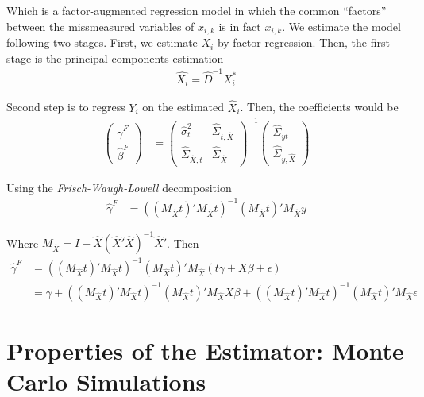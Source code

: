 \documentclass[10pt]{article}
\def\g{\gamma}
\begin{document}
        Which is a factor-augmented regression model in which the common ``factors'' between the missmeasured variables of $x_{i,k}$ is in fact $x_{i,k}$. We estimate the model following two-stages. First, we estimate $X_i$ by factor regression. Then, the first-stage is the principal-components estimation
        \begin{align}
            \hat{X_i}=\hat{D}^{-1}X_i^*
        \end{align}
        
        Second step is to regress $Y_i$ on the estimated $\hat X_i$. Then, the coefficients would be
        \begin{align}
            \left(\begin{array}{l}
        \hat{\gamma}^{F} \\
        \hat{\beta}^{F}
        \end{array}\right)&=\left(\begin{array}{cc}
        \hat{\sigma}^2_{t} & \hat\Sigma_{t,\hat X} \\
        \hat \Sigma_{\hat X,t} & \hat {\Sigma}_{\hat X}
        \end{array}\right)^{-1}\left(\begin{array}{c}
        \hat \Sigma_{yt} \\
        \hat \Sigma_{y,\hat X}
        \end{array}\right)
        \end{align}
        
        Using the \textit{Frisch-Waugh-Lowell} decomposition
        \begin{align}
            \hat{\g}^F & = ((M_{\hat{X}}t)'M_{\hat{X}}t)^{-1}(M_{\hat{X}}t)'M_{\hat{X}}y
        \end{align}
        
        Where $M_{\hat{X}}=I-\hat{X}(\hat{X}'\hat{X})^{-1}\hat{X}'$. Then
        \begin{align}
             \hat{\g}^F & = ((M_{\hat{X}}t)'M_{\hat{X}}t)^{-1}(M_{\hat{X}}t)'M_{\hat{X}}(t\gamma  + X\beta + \epsilon) \\
             &=\gamma +((M_{\hat{X}}t)'M_{\hat{X}}t)^{-1}(M_{\hat{X}}t)'M_{\hat{X}}X\beta+((M_{\hat{X}}t)'M_{\hat{X}}t)^{-1}(M_{\hat{X}}t)'M_{\hat{X}}\epsilon
        \end{align}

\section*{Properties of the Estimator: Monte Carlo Simulations}
\end{document}
